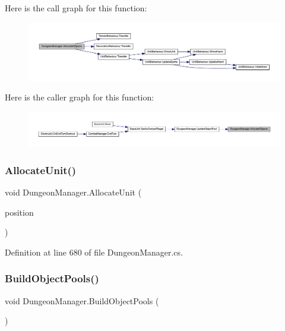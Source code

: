 Here is the call graph for this function\+:
\nopagebreak
\begin{figure}[H]
\begin{center}
\leavevmode
\includegraphics[width=350pt]{class_dungeon_manager_a196f2f6754dae0d38307197bbbf033c4_cgraph}
\end{center}
\end{figure}
Here is the caller graph for this function\+:
\nopagebreak
\begin{figure}[H]
\begin{center}
\leavevmode
\includegraphics[width=350pt]{class_dungeon_manager_a196f2f6754dae0d38307197bbbf033c4_icgraph}
\end{center}
\end{figure}
\mbox{\label{class_dungeon_manager_a384a7907b2dba3017c3b4870c089e3ff}} 
\subsubsection{\texorpdfstring{AllocateUnit()}{AllocateUnit()}}
{\footnotesize\ttfamily void Dungeon\+Manager.\+Allocate\+Unit (\begin{DoxyParamCaption}\item[{Vector2\+Int}]{position }\end{DoxyParamCaption})}



Definition at line 680 of file Dungeon\+Manager.\+cs.

\mbox{\label{class_dungeon_manager_a5a401d26555b3eff094668620d4857ca}} 
\subsubsection{\texorpdfstring{BuildObjectPools()}{BuildObjectPools()}}
{\footnotesize\ttfamily void Dungeon\+Manager.\+Build\+Object\+Pools (\begin{DoxyParamCaption}{ }\end{DoxyParamCaption})}



